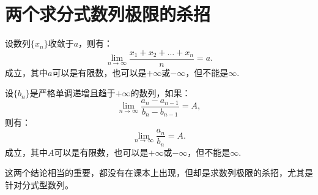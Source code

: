 \section{两个求分式数列极限的杀招}

\begin{proposition}[Cauchy命题]
	设数列$\{x_n\}$收敛于$a$，则有：
	\begin{equation}
		\displaystyle\lim_{n\to\infty}\dfrac{x_1+x_2+\dots+x_n}{n}=a.
	\end{equation}
	成立，其中$a$可以是有限数，也可以是$+\infty$或$-\infty$，但不能是$\infty$.
\end{proposition}

\begin{proposition}[Stolz定理]
	设$\{b_n\}$是严格单调递增且趋于$+\infty$的数列，如果：
	\[\displaystyle\lim_{n\to\infty}\dfrac{a_n-a_{n-1}}{b_n-b_{n-1}}=A,\]
	则有：
	\begin{equation}
		\displaystyle\lim_{n\to\infty}\dfrac{a_n}{b_n}=A.
	\end{equation}
	成立，其中$A$可以是有限数，也可以是$+\infty$或$-\infty$，但不能是$\infty$.
\end{proposition}

这两个结论相当的重要，都没有在课本上出现，但却是求数列极限的杀招，尤其是针对分式型数列。